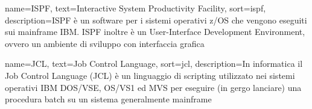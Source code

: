 {
    name=ISPF,
    text=Interactive System Productivity Facility,
    sort=ispf,
    description={ISPF è un software per i sistemi operativi z/OS che vengono eseguiti sui mainframe IBM. ISPF inoltre è un User-Interface Development Environment, ovvero un ambiente di sviluppo con interfaccia grafica}
}




{
    name=JCL,
    text=Job Control Language,
    sort=jcl,
    description={In informatica il Job Control Language (JCL) è un linguaggio di scripting utilizzato nei sistemi operativi IBM DOS/VSE, OS/VS1 ed MVS per eseguire (in gergo lanciare) una procedura batch su un sistema generalmente mainframe}
}





